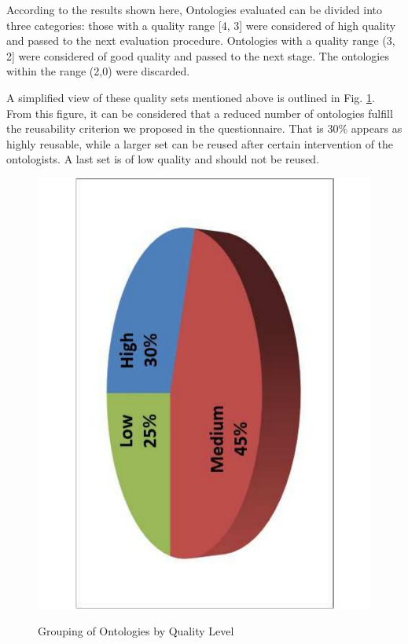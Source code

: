 According to the results shown here, Ontologies evaluated can be divided into three categories: those with a quality range [4, 3] were considered of high quality and passed to the next evaluation procedure. Ontologies with a quality range (3, 2] were considered of good quality and passed to the next stage. The ontologies within the range (2,0) were discarded.   






A simplified view of these quality sets mentioned above is outlined in Fig. \ref{figure4-2}. From this figure, it can be considered that a reduced number of ontologies fulfill the reusability criterion we proposed in the questionnaire.  That is 30\% appears as highly reusable, while a larger set can be reused   after certain intervention of the ontologists. A last set is of low quality and should not be reused. 


\begin{figure}
	\begin{center}
		\includegraphics[scale=0.4, angle=-90]{figure-chapterIV/fig4-2.pdf}\\
		\caption{Grouping of Ontologies by Quality Level}
		\label{figure4-2}
	\end{center}
\end{figure}



